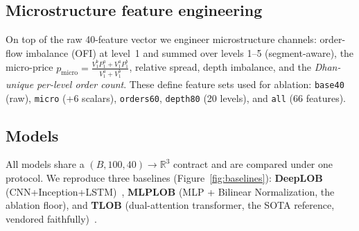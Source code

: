 \documentclass[10pt,twocolumn]{article}
\begin{document}
\subsection{Microstructure feature engineering}
On top of the raw 40-feature vector we engineer microstructure channels: order-flow imbalance (OFI) at
level~1 and summed over levels 1--5 (segment-aware), the micro-price
$p_{\mathrm{micro}}=\tfrac{V_1^b P_1^a + V_1^a P_1^b}{V_1^a+V_1^b}$, relative spread, depth imbalance, and the
\emph{Dhan-unique per-level order count}. These define feature sets used for ablation: \texttt{base40} (raw),
\texttt{micro} (+6 scalars), \texttt{orders60}, \texttt{depth80} (20 levels), and \texttt{all} (66 features).

\subsection{Models}
All models share a $(B,100,40)\!\rightarrow\!\mathbb{R}^3$ contract and are compared under one protocol. We
reproduce three baselines (Figure~\ref{fig:baselines}): \textbf{DeepLOB} (CNN+Inception+LSTM)~\cite{deeplob},
\textbf{MLPLOB} (MLP + Bilinear Normalization, the ablation floor), and \textbf{TLOB} (dual-attention
transformer, the SOTA reference, vendored faithfully)~\cite{tlob}.
\end{document}
